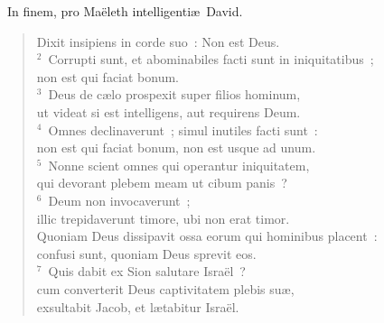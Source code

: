 ~\lettrine[lines=10,image=true,loversize=0.05,lraise=-0.03]{I}{}n finem, pro Ma\"eleth intelligenti\ae\ David. \begin{flushleft}\begin{verse}\vspace{6pt}Dixit insipiens in corde suo~: Non est Deus.\\
${}^{2}$~Corrupti sunt, et abominabiles facti sunt in iniquitatibus~;\\ non est qui faciat bonum.\\
${}^{3}$~Deus de c\ae lo prospexit super filios hominum,\\ ut videat si est intelligens, aut requirens Deum.\\
${}^{4}$~Omnes declinaverunt~; simul inutiles facti sunt~:\\ non est qui faciat bonum, non est usque ad unum.\\
${}^{5}$~Nonne scient omnes qui operantur iniquitatem,\\ qui devorant plebem meam ut cibum panis~?\\
${}^{6}$~Deum non invocaverunt~;\\ illic trepidaverunt timore, ubi non erat timor.\\ Quoniam Deus dissipavit ossa eorum qui hominibus placent~:\\ confusi sunt, quoniam Deus sprevit eos.\\
${}^{7}$~Quis dabit ex Sion salutare Isra\"el~?\\ cum converterit Deus captivitatem plebis su\ae ,\\ exsultabit Jacob, et l\ae tabitur Isra\"el.\end{verse}\end{flushleft}


